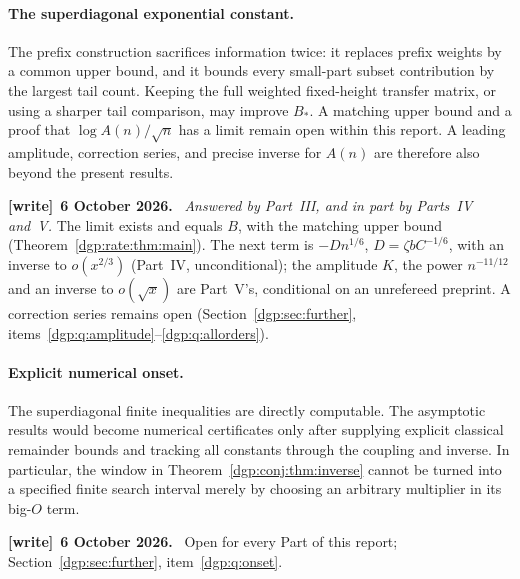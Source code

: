 \documentclass[11pt,letterpaper]{article}
\numberwithin{equation}{section}
\theoremstyle{remark}\newtheorem{remark}[theorem]{Remark}
\newenvironment{writenote}[1][]{\par\smallskip\begingroup\small
 \noindent\textbf{[write]}\if\relax\detokenize{#1}\relax\else~\textbf{#1.}\fi\ }%
 {\par\endgroup\smallskip}
\begin{document}
\paragraph{The superdiagonal exponential constant.}
The prefix construction sacrifices information twice: it replaces
prefix weights by a common upper bound, and it bounds every
small-part subset contribution by the largest tail count. Keeping
the full weighted fixed-height transfer matrix, or using a sharper
tail comparison, may improve $B_*$. A matching upper bound and a
proof that $\log A(n)/\sqrt n$ has a limit remain open within this
report. A leading amplitude, correction series, and precise inverse
for $A(n)$ are therefore also beyond the present results.
\begin{writenote}[6 October 2026]
\emph{Answered by Part~III, and in part by Parts~IV and~V.} The limit exists and equals $B$, with the matching upper bound (Theorem~\ref{dgp:rate:thm:main}). The next term is $-Dn^{1/6}$, $D=\zeta bC^{-1/6}$, with an inverse to $o(x^{2/3})$ (Part~IV, unconditional); the amplitude $K$, the power $n^{-11/12}$ and an inverse to $o(\sqrt x)$ are Part~V's, conditional on an unrefereed preprint. A correction series remains open (Section~\ref{dgp:sec:further}, items~\ref{dgp:q:amplitude}--\ref{dgp:q:allorders}).
\end{writenote}

\paragraph{Explicit numerical onset.}
The superdiagonal finite inequalities are directly computable.
The asymptotic results would become numerical certificates only
after supplying explicit classical remainder bounds and tracking
all constants through the coupling and inverse. In particular, the
window in Theorem~\ref{dgp:conj:thm:inverse} cannot be turned into a
specified finite search interval merely by choosing an arbitrary
multiplier in its big-$O$ term.
\begin{writenote}[6 October 2026]
Open for every Part of this report; Section~\ref{dgp:sec:further}, item~\ref{dgp:q:onset}.
\end{writenote}

\clearpage
\end{document}
